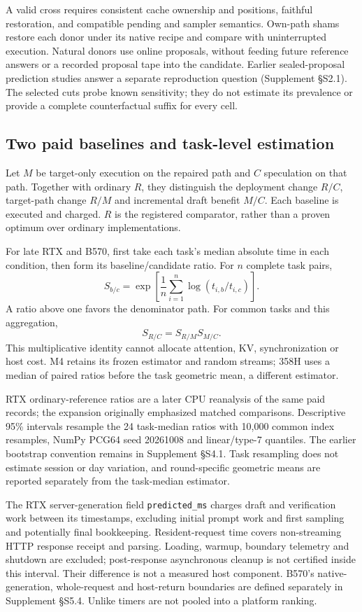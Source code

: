 A valid cross requires consistent cache ownership and positions, faithful restoration, and compatible pending and sampler semantics. Own-path shams restore each donor under its native recipe and compare with uninterrupted execution. Natural donors use online proposals, without feeding future reference answers or a recorded proposal tape into the candidate. Earlier sealed-proposal prediction studies answer a separate reproduction question (Supplement \S S2.1). The selected cuts probe known sensitivity; they do not estimate its prevalence or provide a complete counterfactual suffix for every cell.

\subsection{Two paid baselines and task-level estimation}
Let $M$ be target-only execution on the repaired path and $C$ speculation on that path. Together with ordinary $R$, they distinguish the deployment change $R/C$, target-path change $R/M$ and incremental draft benefit $M/C$. Each baseline is executed and charged. $R$ is the registered comparator, rather than a proven optimum over ordinary implementations.

For late RTX and B570, first take each task's median absolute time in each condition, then form its baseline/candidate ratio. For $n$ complete task pairs,
\begin{equation}
S_{b/c}=\exp\left[\frac{1}{n}\sum_{i=1}^{n}\log\left(t_{i,b}/t_{i,c}\right)\right].
\label{eq:gm}
\end{equation}
A ratio above one favors the denominator path. For common tasks and this aggregation,
\begin{equation}
S_{R/C}=S_{R/M}S_{M/C}.
\label{eq:identity}
\end{equation}
This multiplicative identity cannot allocate attention, KV, synchronization or host cost. M4 retains its frozen estimator and random streams; 358H uses a median of paired ratios before the task geometric mean, a different estimator.

RTX ordinary-reference ratios are a later CPU reanalysis of the same paid records; the expansion originally emphasized matched comparisons. Descriptive 95\% intervals resample the 24 task-median ratios with 10,000 common index resamples, NumPy PCG64 seed 20261008 and linear/type-7 quantiles. The earlier bootstrap convention remains in Supplement \S S4.1. Task resampling does not estimate session or day variation, and round-specific geometric means are reported separately from the task-median estimator.

The RTX server-generation field \texttt{predicted\_ms} charges draft and verification work between its timestamps, excluding initial prompt work and first sampling and potentially final bookkeeping. Resident-request time covers non-streaming HTTP response receipt and parsing. Loading, warmup, boundary telemetry and shutdown are excluded; post-response asynchronous cleanup is not certified inside this interval. Their difference is not a measured host component. B570's native-generation, whole-request and host-return boundaries are defined separately in Supplement \S S5.4. Unlike timers are not pooled into a platform ranking.
